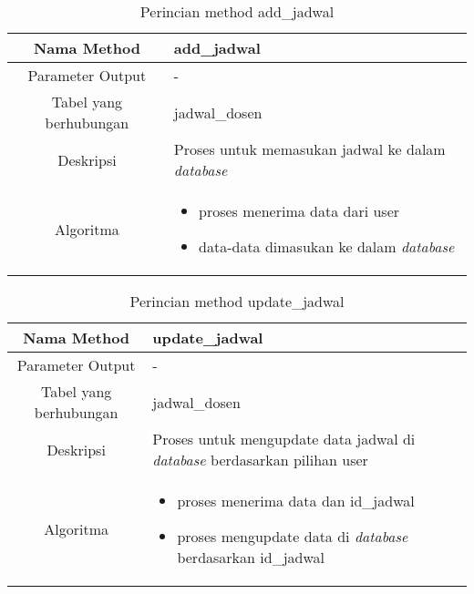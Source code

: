 \begin{center}
\begin{table}[H]
\begin{tabular}{|c|p{11cm}|}
\hline
Nama Method 	& 	add\_jadwal 	\\
\hline
Parameter Output & - \\
\hline
Tabel yang berhubungan & jadwal\_dosen \\
\hline
Deskripsi	& Proses untuk memasukan jadwal ke dalam \textit{database} \\
\hline
Algoritma	& \begin{itemize}
				\item proses menerima data dari user
				\item data-data dimasukan ke dalam \textit{database}
				\end{itemize} \\
\hline
\end{tabular}
\caption{Perincian method add\_jadwal}
\end{table}
\end{center}


\begin{center}
\begin{table}[H]
\begin{tabular}{|c|p{11cm}|}
\hline
Nama Method 	& 	update\_jadwal 	\\
\hline
Parameter Output & - \\
\hline
Tabel yang berhubungan & jadwal\_dosen \\
\hline
Deskripsi	& Proses untuk mengupdate data jadwal di \textit{database} berdasarkan pilihan user\\
\hline
Algoritma	& \begin{itemize}
				\item proses menerima data dan id\_jadwal
				\item proses mengupdate data di \textit{database} berdasarkan id\_jadwal
				\end{itemize} \\
\hline
\end{tabular}
\caption{Perincian method update\_jadwal}
\end{table}
\end{center}


